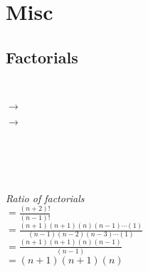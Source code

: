 \documentclass{article}
\begin{document}
\pagebreak
\section{\centering \huge Misc}
    \centering
    \subsection{\huge Factorials}

        \hrulefill \\[10pt]


            $\rightarrow$


            $\rightarrow$


            \hrulefill \\[10pt]

    \\

    \hrulefill \\[10pt]

    \\[5pt]
    \textit{Ratio of factorials}\\[15pt]

    $=\frac{(n+2)!}{(n-1)!}$\\[15pt]
    
    $= \frac{(n+1)(n+1)(n)(n-1)\cdots(1)}{(n-1)(n-2)(n-3)\cdots(1)}$\\[15pt]
    
    $= \frac{(n+1)(n+1)(n)(n-1)}{(n-1)}$\\[15pt]

    $= {(n+1)(n+1)(n)}$\\[15pt]
\end{document}
